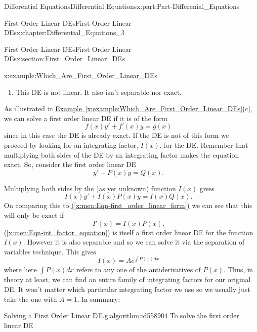 \documentclass[oneside,10pt,]{book}
\newcommand{\xreffont}{\relax}
\numberwithin{equation}{section}
\begin{document}
\begin{partptx}{Differential Equations}{}{Differential Equations}{}{}{x:part:Part-Differenial_Equations}
\begin{chapterptx}{First Order Linear DEs}{}{First Order Linear DEs}{}{}{x:chapter:Differential_Equations_3}
\begin{sectionptx}{First Order Linear DEs}{}{First Order Linear DEs}{}{}{x:section:First_Order_Linear_DEs}
\begin{example}{}{x:example:Which_Are_First_Order_Linear_DEs}
\begin{enumerate}[label=\alph*]
This observation leads to the solution of the DE very efficiently.%
\item{}This DE is not linear. It also isn’t separable nor exact.%
\end{enumerate}
%
\end{example}
As illustrated in \hyperref[x:example:Which_Are_First_Order_Linear_DEs]{Example~{\xreffont\ref{x:example:Which_Are_First_Order_Linear_DEs}}}(c), we can solve a first order linear DE if it is of the form%
\begin{equation}
f(x) y' + f'(x) y = g(x)\label{x:men:Eqn-first_order_linear_form}
\end{equation}
since in this case the DE is already exact. If the DE is not of this form we proceed by looking for an integrating factor, \(I(x)\), for the DE. Remember that multiplying both sides of the DE by an integrating factor makes the equation exact. So, consider the first order linear DE%
\begin{equation*}
y'+P(x)y = Q(x)\text{.}
\end{equation*}
%
\par
Multiplying both sides by the (as yet unknown) function \(I(x)\) gives%
\begin{equation*}
I(x)y' + I(x) P(x)y = I(x) Q(x)\text{.}
\end{equation*}
On comparing this to \hyperref[x:men:Eqn-first_order_linear_form]{({\xreffont\ref{x:men:Eqn-first_order_linear_form}})} we can see that this will only be exact if%
\begin{equation}
I'(x) = I(x)P(x)\text{,}\label{x:men:Eqn-int_factor_equation}
\end{equation}
\hyperref[x:men:Eqn-int_factor_equation]{({\xreffont\ref{x:men:Eqn-int_factor_equation}})} is itself a first order linear DE for the function \(I(x)\). However it is also separable and so we can solve it via the separation of variables technique. This gives%
\begin{equation*}
I(x) = A e ^{\int P(x) dx}
\end{equation*}
where here \(\int P(x) dx\) refers to any one of the antiderivatives of \(P(x)\). Thus, in theory at least, we can find an entire family of integrating factors for our original DE. It won’t matter which particular integrating factor we use so we usually just take the one with \(A=1\). In summary:%
\begin{algorithm}{Solving a First Order Linear DE.}{}{g:algorithm:id558904}%
To solve the first order linear DE%
\begin{equation*}

\end{equation*}
\end{algorithm}
\end{sectionptx}
\end{chapterptx}
\end{partptx}
\end{document}
